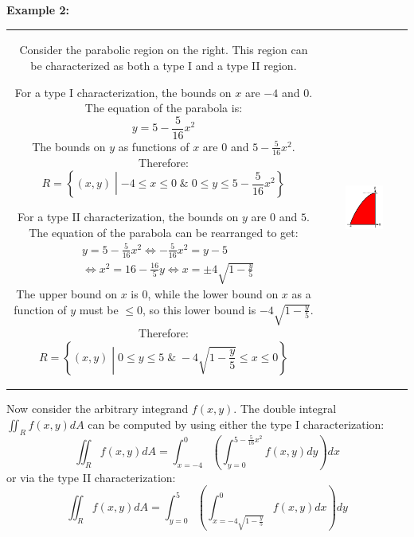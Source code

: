 \documentclass{article}
\begin{document}
\pagebreak

\textbf{Example 2:}  

\vspace{5mm}

\begin{tabular}{cc}
\parbox{0.5\textwidth}{
Consider the parabolic region on the right. This region can be characterized as both a type I and a type II region.    

For a type I characterization, the bounds on \(x\) are \(-4\) and \(0\). The equation of the parabola is: 
\[y = 5 - \frac{5}{16}x^2\]
The bounds on \(y\) as functions of \(x\) are \(0\) and \(5 - \frac{5}{16}x^2\). Therefore:
\[R = \left\{(x,y) \middle| -4 \leq x \leq 0 \;\&\; 0 \leq y \leq 5 - \frac{5}{16}x^2\right\}\]

For a type II characterization, the bounds on \(y\) are \(0\) and \(5\). The equation of the parabola can be rearranged to get: 
\begin{align*}
& y = 5 - \frac{5}{16}x^2 \iff -\frac{5}{16}x^2 = y - 5 \\
& \iff x^2 = 16 - \frac{16}{5}y \iff x = \pm 4\sqrt{1 - \frac{y}{5}}
\end{align*}
The upper bound on \(x\) is \(0\), while the lower bound on \(x\) as a function of \(y\) must be \(\leq 0\), so this lower bound is \(-4\sqrt{1 - \frac{y}{5}}\). Therefore:
\[R = \left\{(x,y) \middle| 0 \leq y \leq 5 \;\&\; -4\sqrt{1 - \frac{y}{5}} \leq x \leq 0\right\}\]

} & \parbox{0.5\textwidth}{
\includegraphics[width = 0.5\textwidth]{Example_2}
}
\end{tabular}
Now consider the arbitrary integrand \(f(x,y)\). The double integral \(\iint_R f(x,y)dA\) can be computed by using either the type I characterization: 
\[\iint_R f(x,y)dA = \int_{x = -4}^0 \left(\int_{y = 0}^{5 - \frac{5}{16}x^2} f(x,y)dy\right)dx\] 
or via the type II characterization: 
\[\iint_R f(x,y)dA = \int_{y = 0}^5 \left(\int_{x = -4\sqrt{1 - \frac{y}{5}}}^{0} f(x,y)dx\right)dy\]
\end{document}
